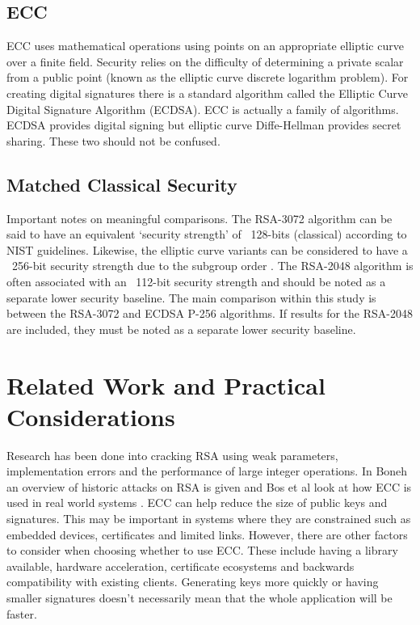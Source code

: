 \documentclass[conference]{IEEEtran}
\begin{document}
\subsection{ECC}

ECC uses mathematical operations using points on an appropriate elliptic curve over a finite field. Security relies on the difficulty of determining a private scalar from a public point (known as the elliptic curve discrete logarithm problem). For creating digital signatures there is a standard algorithm called the Elliptic Curve Digital Signature Algorithm \cite{b1} (ECDSA). ECC is actually a family of algorithms. ECDSA provides digital signing but elliptic curve Diffe-Hellman provides secret sharing. These two should not be confused. 

\subsection{Matched Classical Security}

Important notes on meaningful comparisons. The RSA-3072 algorithm can be said to have an equivalent ‘security strength’ of ~128-bits (classical) according to NIST guidelines. Likewise, the elliptic curve variants can be considered to have a ~256-bit security strength due to the subgroup order \cite{b2}. The RSA-2048 algorithm is often associated with an ~112-bit security strength and should be noted as a separate lower security baseline. The main comparison within this study is between the RSA-3072 and ECDSA P-256 algorithms. If results for the RSA-2048 are included, they must be noted as a separate lower security baseline.

\section{Related Work and Practical Considerations}

Research has been done into cracking RSA using weak parameters, implementation errors and the performance of large integer operations. In Boneh an overview of historic attacks on RSA is given \cite{b3} and Bos et al look at how ECC is used in real world systems \cite{b4}.
ECC can help reduce the size of public keys and signatures. This may be important in systems where they are constrained such as embedded devices, certificates and limited links. However, there are other factors to consider when choosing whether to use ECC. These include having a library available, hardware acceleration, certificate ecosystems and backwards compatibility with existing clients. Generating keys more quickly or having smaller signatures doesn’t necessarily mean that the whole application will be faster.
\end{document}
